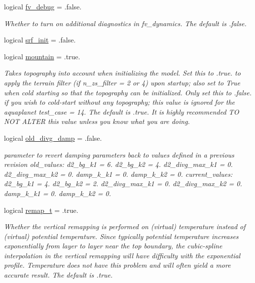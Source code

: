 \begin{DoxyCompactItemize}
logical \hyperlink{structfv__arrays__mod_1_1fv__flags__type_aa4430a562824fe3ce7ea0834babe2c0b}{fv\-\_\-debug} = .false.
\begin{DoxyCompactList}\small\item\em Whether to turn on additional diagnostics in fv\-\_\-dynamics. The default is .false. \end{DoxyCompactList}\item 
logical \hyperlink{structfv__arrays__mod_1_1fv__flags__type_a89f77eb07284c379078aa4dd37ec57fe}{srf\-\_\-init} = .false.
\item 
logical \hyperlink{structfv__arrays__mod_1_1fv__flags__type_ab0200da2e7fbf552254b20195d89808b}{mountain} = .true.
\begin{DoxyCompactList}\small\item\em Takes topography into account when initializing the model. Set this to .true. to apply the terrain filter (if n\-\_\-zs\-\_\-filter = 2 or 4) upon startup; also set to True when cold starting so that the topography can be initialized. Only set this to .false. if you wish to cold-\/start without any topography; this value is ignored for the aquaplanet test\-\_\-case = 14. The default is .true. It is highly recommended T\-O N\-O\-T A\-L\-T\-E\-R this value unless you know what you are doing. \end{DoxyCompactList}\item 
logical \hyperlink{structfv__arrays__mod_1_1fv__flags__type_a2431d9bbce3aee3c96d0d5129d87e174}{old\-\_\-divg\-\_\-damp} = .false.
\begin{DoxyCompactList}\small\item\em parameter to revert damping parameters back to values defined in a previous revision old\-\_\-values\-: d2\-\_\-bg\-\_\-k1 = 6. d2\-\_\-bg\-\_\-k2 = 4. d2\-\_\-divg\-\_\-max\-\_\-k1 = 0. d2\-\_\-divg\-\_\-max\-\_\-k2 = 0. damp\-\_\-k\-\_\-k1 = 0. damp\-\_\-k\-\_\-k2 = 0. current\-\_\-values\-: d2\-\_\-bg\-\_\-k1 = 4. d2\-\_\-bg\-\_\-k2 = 2. d2\-\_\-divg\-\_\-max\-\_\-k1 = 0. d2\-\_\-divg\-\_\-max\-\_\-k2 = 0. damp\-\_\-k\-\_\-k1 = 0. damp\-\_\-k\-\_\-k2 = 0. \end{DoxyCompactList}\item 
logical \hyperlink{structfv__arrays__mod_1_1fv__flags__type_a78ac3950ee46ddf7487ff9abe7599b70}{remap\-\_\-t} = .true.
\begin{DoxyCompactList}\small\item\em Whether the vertical remapping is performed on (virtual) temperature instead of (virtual) potential temperature. Since typically potential temperature increases exponentially from layer to layer near the top boundary, the cubic-\/spline interpolation in the vertical remapping will have difficulty with the exponential profile. Temperature does not have this problem and will often yield a more accurate result. The default is .true. \end{DoxyCompactList}\item 

\end{DoxyCompactItemize}
